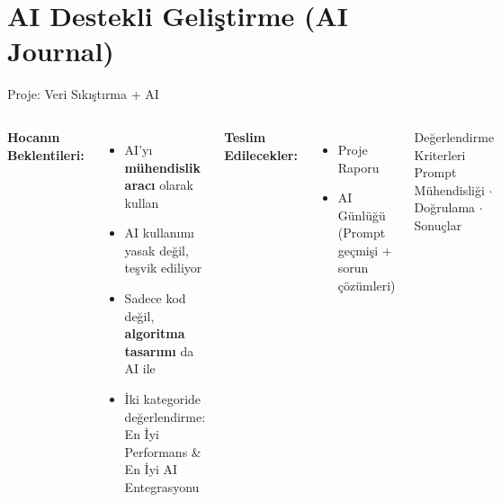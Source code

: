\documentclass[10pt,aspectratio=43]{beamer}
\begin{document}
\section{AI Destekli Geliştirme (AI Journal)}

\begin{frame}{Proje: Veri Sıkıştırma + AI}
  \begin{columns}[T]
    \textbf{Hocanın Beklentileri:}
    \vspace{0.3em}
    \begin{itemize}
      \setlength{\itemsep}{0.4em}
      \item AI'yı \textbf{mühendislik aracı} olarak kullan
      \item AI kullanımı yasak değil, \alert{teşvik ediliyor}
      \item Sadece kod değil, \textbf{algoritma tasarımı} da AI ile
      \item İki kategoride değerlendirme: \\ En İyi Performans \& En İyi AI Entegrasyonu
    \end{itemize}

    \textbf{Teslim Edilecekler:}
    \vspace{0.3em}
    \begin{itemize}
      \setlength{\itemsep}{0.4em}
      \item Proje Raporu
      \item \alert{AI Günlüğü} (Prompt geçmişi + sorun çözümleri)
    \end{itemize}

    \vspace{0.5em}
    \begin{block}{Değerlendirme Kriterleri}
      Prompt Mühendisliği $\cdot$ Doğrulama $\cdot$ Sonuçlar
    \end{block}
  \end{columns}
\end{frame}
\end{document}

